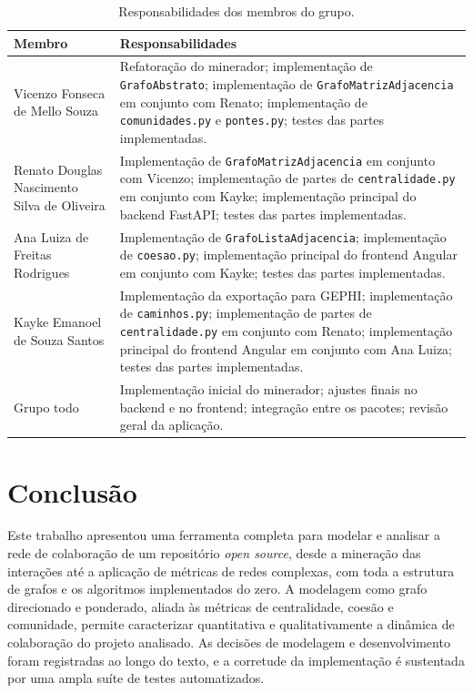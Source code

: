 \documentclass[12pt]{article}
\begin{document}
\begin{table}[!ht]
\centering
\caption{Responsabilidades dos membros do grupo.}
\label{tab:resp}
\small
\begin{tabularx}{\textwidth}{>{\raggedright\arraybackslash}p{}Y}
\toprule
\textbf{Membro} & \textbf{Responsabilidades} \\
\midrule
Vicenzo Fonseca de Mello Souza & Refatoração do minerador; implementação de
\texttt{GrafoAbstrato}; implementação de \texttt{GrafoMatrizAdjacencia} em
conjunto com Renato; implementação de \texttt{comunidades.py} e
\texttt{pontes.py}; testes das partes implementadas. \\
Renato Douglas Nascimento Silva de Oliveira & Implementação de
\texttt{GrafoMatrizAdjacencia} em conjunto com Vicenzo; implementação de partes de
\texttt{centralidade.py} em conjunto com Kayke; implementação principal do backend
FastAPI; testes das partes implementadas. \\
Ana Luiza de Freitas Rodrigues & Implementação de \texttt{GrafoListaAdjacencia};
implementação de \texttt{coesao.py}; implementação principal do frontend Angular
em conjunto com Kayke; testes das partes implementadas. \\
Kayke Emanoel de Souza Santos & Implementação da exportação para GEPHI;
implementação de \texttt{caminhos.py}; implementação de partes de
\texttt{centralidade.py} em conjunto com Renato; implementação principal do
frontend Angular em conjunto com Ana Luiza; testes das partes implementadas. \\
Grupo todo & Implementação inicial do minerador; ajustes finais no backend e no
frontend; integração entre os pacotes; revisão geral da aplicação. \\
\bottomrule
\end{tabularx}
\end{table}

\section{Conclusão}
\label{sec:conclusao}

Este trabalho apresentou uma ferramenta completa para modelar e analisar a rede
de colaboração de um repositório \emph{open source}, desde a mineração das
interações até a aplicação de métricas de redes complexas, com toda a estrutura
de grafos e os algoritmos implementados do zero. A modelagem como grafo
direcionado e ponderado, aliada às métricas de centralidade, coesão e
comunidade, permite caracterizar quantitativa e qualitativamente a dinâmica de
colaboração do projeto analisado. As decisões de modelagem e desenvolvimento
foram registradas ao longo do texto, e a corretude da implementação é sustentada
por uma ampla suíte de testes automatizados.

% 
% 
\end{document}
